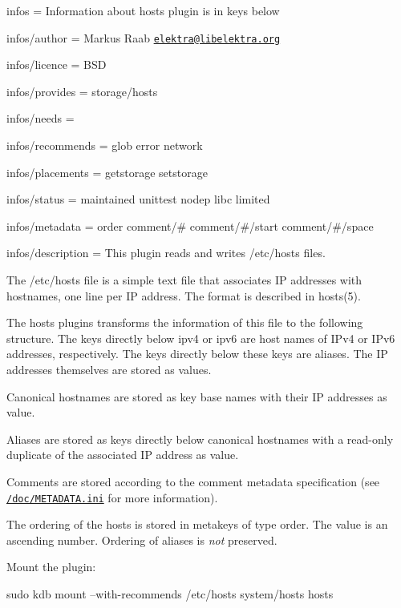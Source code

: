 
\begin{DoxyItemize}
\item infos = Information about hosts plugin is in keys below
\item infos/author = Markus Raab \href{mailto:elektra@libelektra.org}{\tt elektra@libelektra.\+org}
\item infos/licence = B\+SD
\item infos/provides = storage/hosts
\item infos/needs =
\item infos/recommends = glob error network
\item infos/placements = getstorage setstorage
\item infos/status = maintained unittest nodep libc limited
\item infos/metadata = order comment/\# comment/\#/start comment/\#/space
\item infos/description = This plugin reads and writes /etc/hosts files.
\end{DoxyItemize}

The {\ttfamily /etc/hosts} file is a simple text file that associates IP addresses with hostnames, one line per IP address. The format is described in {\ttfamily hosts(5)}.

The {\ttfamily hosts} plugins transforms the information of this file to the following structure. The keys directly below {\ttfamily ipv4} or {\ttfamily ipv6} are host names of I\+Pv4 or I\+Pv6 addresses, respectively. The keys directly below these keys are aliases. The IP addresses themselves are stored as values.

Canonical hostnames are stored as key base names with their IP addresses as value.

Aliases are stored as keys directly below canonical hostnames with a read-\/only duplicate of the associated IP address as value.

Comments are stored according to the comment metadata specification (see \href{/home/jenkins/workspace/libelektra-release/doc/METADATA.ini}{\tt /doc/\+M\+E\+T\+A\+D\+A\+TA.ini} for more information).

The ordering of the hosts is stored in metakeys of type {\ttfamily order}. The value is an ascending number. Ordering of aliases is {\itshape not} preserved.

Mount the plugin\+:


\begin{DoxyCode}
sudo kdb mount --with-recommends /etc/hosts system/hosts hosts
\end{DoxyCode}


